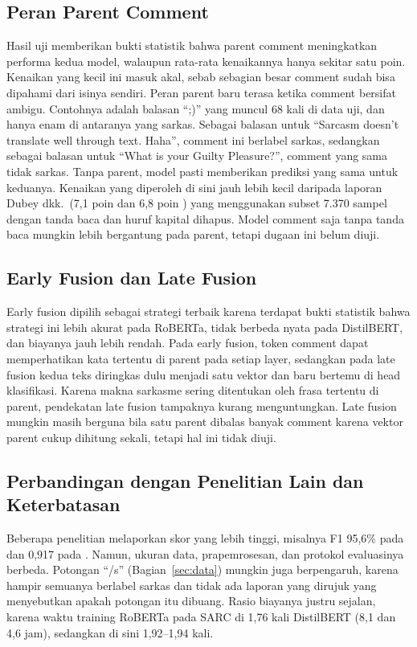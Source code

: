 \documentclass[conference]{IEEEtran}
\begin{document}
\subsection{Peran Parent Comment}
Hasil uji memberikan bukti statistik bahwa parent comment meningkatkan performa kedua model, walaupun rata-rata kenaikannya hanya sekitar satu poin. Kenaikan yang kecil ini masuk akal, sebab sebagian besar comment sudah bisa dipahami dari isinya sendiri. Peran parent baru terasa ketika comment bersifat ambigu. Contohnya adalah balasan ``;)'' yang muncul 68 kali di data uji, dan hanya enam di antaranya yang sarkas. Sebagai balasan untuk ``Sarcasm doesn't translate well through text. Haha'', comment ini berlabel sarkas, sedangkan sebagai balasan untuk ``What is your Guilty Pleasure?'', comment yang sama tidak sarkas. Tanpa parent, model pasti memberikan prediksi yang sama untuk keduanya. Kenaikan yang diperoleh di sini jauh lebih kecil daripada laporan Dubey dkk.\ (7,1 poin \cite{dubey2026efficient} dan 6,8 poin \cite{dubey2025unpacking}) yang menggunakan subset 7.370 sampel dengan tanda baca dan huruf kapital dihapus. Model comment saja tanpa tanda baca mungkin lebih bergantung pada parent, tetapi dugaan ini belum diuji.

\subsection{Early Fusion dan Late Fusion}
Early fusion dipilih sebagai strategi terbaik karena terdapat bukti statistik bahwa strategi ini lebih akurat pada RoBERTa, tidak berbeda nyata pada DistilBERT, dan biayanya jauh lebih rendah. Pada early fusion, token comment dapat memperhatikan kata tertentu di parent pada setiap layer, sedangkan pada late fusion kedua teks diringkas dulu menjadi satu vektor dan baru bertemu di head klasifikasi. Karena makna sarkasme sering ditentukan oleh frasa tertentu di parent, pendekatan late fusion tampaknya kurang menguntungkan. Late fusion mungkin masih berguna bila satu parent dibalas banyak comment karena vektor parent cukup dihitung sekali, tetapi hal ini tidak diuji.

\subsection{Perbandingan dengan Penelitian Lain dan Keterbatasan}
Beberapa penelitian melaporkan skor yang lebih tinggi, misalnya F1 95,6\% pada \cite{dubey2026efficient} dan 0,917 pada \cite{zhang2025enhancing}. Namun, ukuran data, prapemrosesan, dan protokol evaluasinya berbeda. Potongan ``/s'' (Bagian~\ref{sec:data}) mungkin juga berpengaruh, karena hampir semuanya berlabel sarkas dan tidak ada laporan yang dirujuk yang menyebutkan apakah potongan itu dibuang. Rasio biayanya justru sejalan, karena waktu training RoBERTa pada SARC di \cite{dubey2026efficient} 1,76 kali DistilBERT (8,1 dan 4,6 jam), sedangkan di sini 1,92--1,94 kali.
\end{document}
